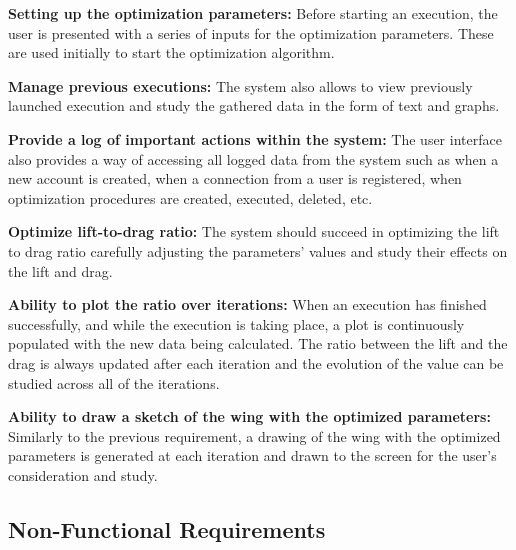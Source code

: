 \documentclass{article}
\begin{document}
\noindent\textbf{Setting up the optimization parameters:}
Before starting an execution, the user is presented with a series of inputs for the optimization parameters. These are used initially to start the optimization algorithm.\\\par

\noindent\textbf{Manage previous executions:}
The system also allows to view previously launched execution and study the gathered data in the form of text and graphs.\\\par


\noindent\textbf{Provide a log of important actions within the system:}
The user interface also provides a way of accessing all logged data from the system such as when a new account is created, when a connection from a user is registered, when optimization procedures are created, executed, deleted, etc.\\\par


\noindent\textbf{Optimize lift-to-drag ratio:}
The system should succeed in optimizing the lift to drag ratio carefully adjusting the parameters' values and study their effects on the lift and drag.\\\par

\noindent\textbf{Ability to plot the ratio over iterations:}
When an execution has finished successfully, and while the execution is taking place, a plot is continuously populated with the new data being calculated. The ratio between the lift and the drag is always updated after each iteration and the evolution of the value can be studied across all of the iterations.\\\par

\noindent\textbf{Ability to draw a sketch of the wing with the optimized parameters:}
Similarly to the previous requirement, a drawing of the wing with the optimized parameters is generated at each iteration and drawn to the screen for the user's consideration and study.\\\par






\subsection{Non-Functional Requirements}
\end{document}
